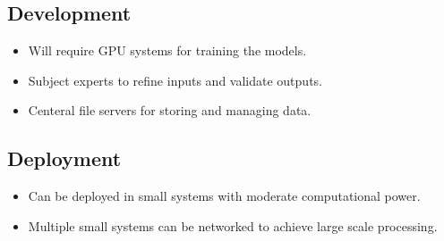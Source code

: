 \subsection{Development}
\begin{itemize}
    \item Will require GPU systems for training the models.
    \item Subject experts to refine inputs and validate outputs.
    \item Centeral file servers for storing and managing data.
\end{itemize}
\subsection{Deployment}
\begin{itemize}
    \item Can be deployed in small systems with moderate computational power.
    \item Multiple small systems can be networked to achieve large scale processing.
\end{itemize}
